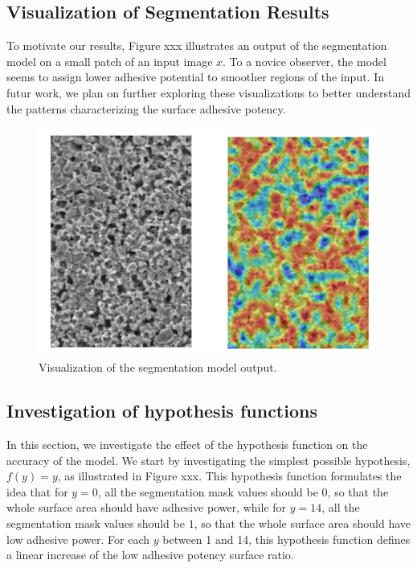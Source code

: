 \documentclass[10pt,twocolumn,letterpaper]{article}
\begin{document}
\subsection{Visualization of Segmentation Results}

To motivate our results, Figure xxx illustrates an output of the segmentation model on a small patch of an input image $x$.
To a novice observer, the model seems to assign lower adhesive potential to smoother regions of the input.
In futur work, we plan on further exploring these visualizations to better understand the 
patterns characterizing the surface adhesive potency.

\begin{figure}[h]
	\centering
	\includegraphics[width=0.9\linewidth]{"./figures/Figure9"}
	\caption{
		Visualization of the segmentation model output.
	}
\end{figure}

\subsection{Investigation of hypothesis functions}

In this section, we investigate the effect of the hypothesis function on the accuracy of the model.
We start by investigating the simplest possible hypothesis, $f(y)=y$, as illustrated in Figure xxx.
This hypothesis function formulates the idea that for $y=0$, 
all the  segmentation mask values should be 0, 
so that the whole surface area should have adhesive power, 
while for $y=14$, all the segmentation mask values should be $1$, so that 
the whole surface area should have low adhesive power.
For each $y$ between 1 and 14, this hypothesis function defines a linear increase
of the low adhesive potency surface ratio.
\end{document}
